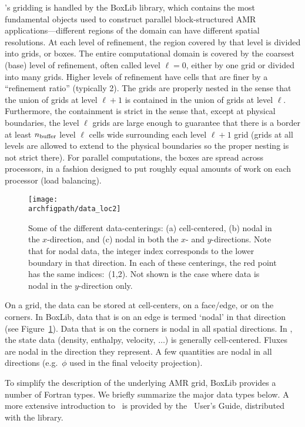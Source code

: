 \maestro's gridding is handled by the BoxLib library, which
contains the most fundamental objects used to construct parallel
block-structured AMR applications---different
regions of the domain can have different spatial resolutions.
At each level of refinement, the region covered by that level is divided
into grids, or boxes.  The entire computational domain is covered by
the coarsest (base) level of refinement, often called level $\ell=0$, either by one
grid or divided into many grids.
Higher levels of refinement have cells that are finer by a ``refinement ratio''
(typically 2).  The grids are properly nested in the sense that the union 
of grids at level $\ell+1$ is contained in the union of grids at level $\ell$.
Furthermore, the containment is strict in the sense that, except at physical 
boundaries, the level $\ell$ grids are large enough to guarantee that there is
a border at least $n_{\rm buffer}$ level $\ell$ cells wide surrounding each level
$\ell +1$ grid (grids at all levels are allowed to extend to the physical
boundaries so the proper nesting is not strict there).  
For parallel computations, the boxes are spread across processors, in
a fashion designed to put roughly equal amounts of work on each
processor (load balancing).

\begin{figure}[t]
\centering
\texttt{[image: \\archfigpath/data\_loc2]}
\caption[Data-centerings on the grid]
  {\label{fig:dataloc} Some of the different data-centerings:
  (a) cell-centered, (b) nodal in the $x$-direction, and (c) nodal in
  both the $x$- and $y$-directions.  Note that for nodal data, the
  integer index corresponds to the lower boundary in that direction.
  In each of these centerings, the red point has the same indices:\ (1,2).
  Not shown is the case where data is nodal in the $y$-direction only.}
\end{figure}
On a grid, the data can be stored at cell-centers, on a face/edge, or
on the corners.  In BoxLib, data that is on an edge is termed `nodal'
in that direction (see Figure~\ref{fig:dataloc}).  Data that is on the
corners is nodal in all spatial directions.  In \maestro, the state
data (density, enthalpy, velocity, $\ldots$) is generally
cell-centered.  Fluxes are nodal in the direction they represent.
A few quantities are nodal in all directions (e.g.\ $\phi$ used in
the final velocity projection).

To simplify the description of the underlying AMR grid, BoxLib
provides a number of Fortran types.  We briefly summarize the major
data types below.  A more extensive introduction to \boxlib\ is 
provided by the \boxlib\ User's Guide, distributed with the library.


